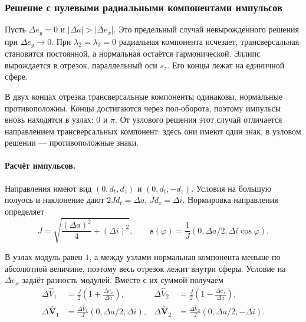 \subsubsection{Решение с нулевыми радиальными компонентами импульсов}
\label{sec:line}

Пусть $\Delta e_y=0$ и $|\Delta a|>|\Delta e_x|$.
Это предельный случай невырожденного решения при $\Delta e_y\to0$.
При $\lambda_2=\lambda_3=0$ радиальная компонента исчезает,
трансверсальная становится постоянной, а нормальная остаётся
гармонической. Эллипс вырождается в отрезок, параллельный оси $s_z$.
Его концы лежат на единичной сфере.

В двух концах отрезка трансверсальные компоненты одинаковы,
нормальные противоположны. Концы достигаются через пол-оборота,
поэтому импульсы вновь находятся в узлах: $0$ и $\pi$.
От узлового решения этот случай отличается направлением трансверсальных
компонент: здесь они имеют один знак, в узловом решении --- противоположные знаки.



\paragraph{Расчёт импульсов.}
Направления имеют вид $(0,d_t,d_z)$ и $(0,d_t,-d_z)$.
Условия на большую полуось и наклонение дают
$2Jd_t=\Delta a$, $Jd_z=\Delta i$.
Нормировка направления определяет
\begin{equation}
 J=\sqrt{\frac{(\Delta a)^2}{4}+(\Delta i)^2},\qquad
 \boldsymbol s(\varphi)=\frac1J(0,\Delta a/2,\Delta i\cos\varphi).
 \label{eq:line-primer}
\end{equation}

В узлах модуль равен $1$, а между узлами нормальная компонента
меньше по абсолютной величине, поэтому весь отрезок лежит внутри сферы.
Условие на $\Delta e_x$ задаёт разность модулей. Вместе с их суммой
получаем
\begin{equation}
\begin{aligned}
 \Delta\widehat V_1&=\frac J2\left(1+\frac{\Delta e_x}{\Delta a}\right),&
 \Delta\widehat V_2&=\frac J2\left(1-\frac{\Delta e_x}{\Delta a}\right),\\
 \Delta\widehat{\boldsymbol V}_1&=
       \frac{\Delta\widehat V_1}{J}(0,\Delta a/2,\Delta i),&
 \Delta\widehat{\boldsymbol V}_2&=
       \frac{\Delta\widehat V_2}{J}(0,\Delta a/2,-\Delta i).
\end{aligned}
\label{eq:line-impulses}
\end{equation}

